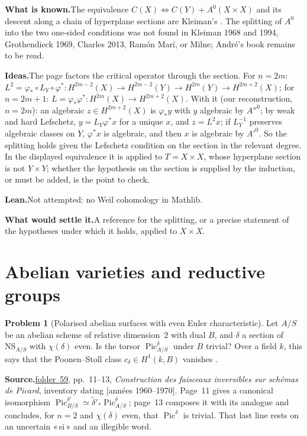 \documentclass[11pt]{article}
\newcommand{\q}[1]{«\,#1\,»}
\newcommand{\fac}[1]{\href{https://grothendieck.umontpellier.fr/#1.pdf}{folder~#1}}
\newcommand{\Pic}{\operatorname{Pic}}
\theoremstyle{definition}
\newtheorem{problem}{Problem}
\theoremstyle{plain}\newtheorem*{proposition}{Proposition}\theoremstyle{definition}
\newcommand{\entry}[1]{\par\medskip\noindent\textbf{#1}\enspace}
\newcommand{\src}[1]{\entry{Source.}#1}
\newcommand{\known}{\entry{What is known.}}
\newcommand{\ideas}{\entry{Ideas.}}
\newcommand{\leanst}{\entry{Lean.}}
\newcommand{\settle}{\entry{What would settle it.}}
\begin{document}
\known The equivalence $C(X) \iff C(Y) + A^0(X \times X)$ and its descent along a chain of hyperplane sections are Kleiman's \cite[Th.~2.13]{kleiman1968}. The splitting of $A^0$ into the two one-sided conditions was not found in Kleiman 1968 and 1994, Grothendieck 1969, Charles 2013, Ramón Marí, or Milne; André's book \cite[ch.~5, \S5.2]{andre} remains to be read.

\ideas The page factors the critical operator through the section. For $n = 2m$: $L^2 = \varphi_* \circ L_Y \circ \varphi^* : H^{2m-2}(X) \to H^{2m-2}(Y) \to H^{2m}(Y) \to H^{2m+2}(X)$; for $n = 2m+1$: $L = \varphi_*\varphi^* : H^{2m}(X) \to H^{2m+2}(X)$. With it (our reconstruction, $n = 2m$): an algebraic $z \in H^{2m+2}(X)$ is $\varphi_*y$ with $y$ algebraic by $A''^{0}$; by weak and hard Lefschetz, $y = L_Y\varphi^*x$ for a unique $x$, and $z = L^2x$; if $L_Y^{-1}$ preserves algebraic classes on $Y$, $\varphi^*x$ is algebraic, and then $x$ is algebraic by $A'^{0}$. So the splitting holds given the Lefschetz condition on the section in the relevant degree. In the displayed equivalence it is applied to $T = X \times X$, whose hyperplane section is not $Y \times Y$; whether the hypothesis on the section is supplied by the induction, or must be added, is the point to check.

\leanst Not attempted: no Weil cohomology in Mathlib.

\settle A reference for the splitting, or a precise statement of the hypotheses under which it holds, applied to $X \times X$.

\section{Abelian varieties and reductive groups}

\begin{problem}[Polarised abelian surfaces with even Euler characteristic]\label{p:surf}
Let $A/S$ be an abelian scheme of relative dimension~$2$ with dual $B$, and $\delta$ a section of $\mathrm{NS}_{A/S}$ with $\chi(\delta)$ even. Is the torsor $\Pic^\delta_{A/S}$ under $B$ trivial? Over a field $k$, this says that the Poonen--Stoll class $c_\delta \in H^1(k, B)$ vanishes \cite{poonenstoll}.
\end{problem}

\src{\fac{59}, pp.~11--13, \emph{Construction des faisceaux inversibles sur schémas de Picard}, inventory dating [années 1960--1970]. Page~11 gives a canonical isomorphism $\Pic^{\delta'}_{B/S} \simeq \tilde\delta'_*\Pic^\delta_{A/S}$; page~13 composes it with its analogue and concludes, for $n = 2$ and $\chi(\delta)$ even, that $\Pic^\delta$ is trivial. That last line rests on an uncertain \q{si} and an illegible word.}
\end{document}
